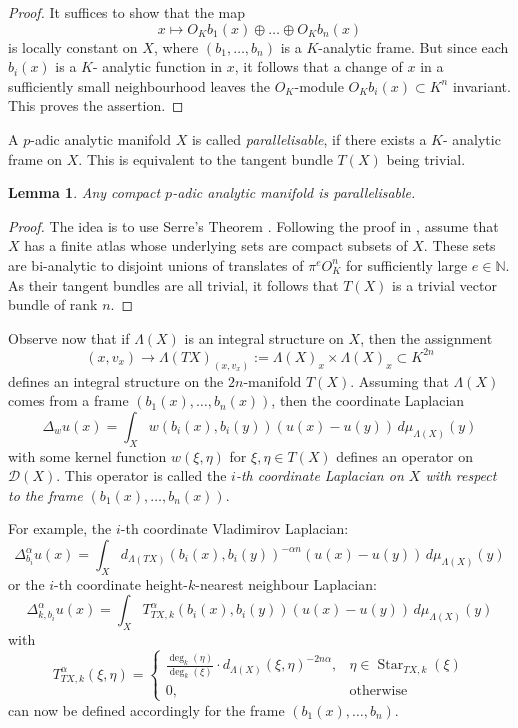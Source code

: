 \documentclass[a4paper,draft]{ZbRad}
\theoremstyle{plain}
\newtheorem{lem}{Lemma}[section]
\theoremstyle{definition}
\numberwithin{equation}{section}
\DeclareMathOperator{\Star}{Star}
\begin{document}
\begin{proof}
It suffices to show that the map
\[
x \mapsto O_K b_1(x) \oplus\dots\oplus O_K b_n(x) 
\]
is locally
constant on $X$, where 
$(b_1,\dots,b_n)$ is a $K$-analytic frame.
But since each $b_i(x)$ is a $K$-
analytic function in $x$, it follows that a change of $x$ in a sufficiently small
neighbourhood leaves the $O_K$-module $O_K b_i(x)\subset K^n$ invariant. This proves
the assertion.
\end{proof}

A $p$-adic analytic manifold $X$ is called \emph{parallelisable}, if there exists a $K$-
analytic frame on $X$. This is equivalent to the tangent bundle $T(X)$ being
trivial.

\begin{lem}
Any compact $p$-adic analytic manifold is parallelisable.
\end{lem}

\begin{proof}
The idea is to use Serre’s Theorem \cite[Théorème (1)]{Serre1965}. Following the
proof in \cite[Lemma 7.5.1]{Igusa2002}, assume that $X$ has a finite atlas whose underlying
sets are compact subsets of $X$. These sets are bi-analytic to disjoint unions of
translates of $\pi^e O_K^n$
for sufficiently large $e\in\mathbb{N}$. As their tangent bundles are
all trivial, it follows that 
$T(X)$ is a trivial vector bundle of rank $n$.
\end{proof}

Observe now that  if $\Lambda(X)$ is an integral structure on $X$, then the assignment
\[
(x,v_x)\to\Lambda(TX)_{(x,v_x)}:=\Lambda(X)_x\times\Lambda(X)_x \subset K^{2n}
\]
defines an integral structure on the $2n$-manifold $T(X)$.
Assuming that $\Lambda(X)$ comes from a frame $(b_1(x),\dots,b_n(x))$, then the coordinate Laplacian
\[
\Delta_w u(x)=\int_X w(b_i(x),b_i(y))(u(x)-u(y))\,d\mu_{\Lambda(X)}(y)
\]
with some kernel function
$w(\xi,\eta)
$ for $\xi,\eta\in T(X)$ defines an operator on $\mathcal{D}(X)$.
This operator is called the
\emph{$i$-th coordinate Laplacian on $X$ with respect to the frame $(b_1(x),\dots,b_n(x))$}.
\newline

For example, the $i$-th coordinate Vladimirov Laplacian:
\[
\Delta_{b_i}^\alpha u(x)=\int_X d_{\Lambda(TX)}(b_i(x),b_i(y))^{-\alpha n}(u(x)-u(y))\,d\mu_{\Lambda(X)}(y)
\]
or the $i$-th coordinate height-$k$-nearest neighbour Laplacian:
\[
\Delta_{k,b_i}^\alpha u(x)=\int_XT_{T\!X,k}^\alpha(b_i(x),b_i(y))(u(x)-u(y))\,d\mu_{\Lambda(X)}(y)
\]
with
\[
T_{T\!X,k}^\alpha(\xi,\eta)=\begin{cases}
\frac{\displaystyle\deg_k(\eta)}{\displaystyle\deg_k(\xi)}\cdot d_{\Lambda(X)}(\xi,\eta)^{-2n\alpha},&
\eta\in\Star_{T\!X,k}(\xi)
\\
0,&\text{otherwise}
\end{cases}
\]
can now be defined accordingly for the frame $(b_1(x),\dots,b_n)$.
\end{document}
